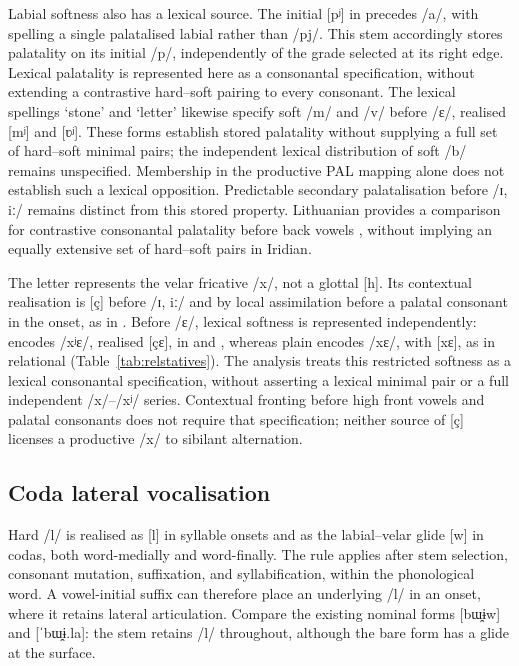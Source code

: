 Labial softness also has a lexical source. The initial [pʲ] in
 precedes /a/, with  spelling a single
palatalised labial rather than /pj/. This stem accordingly stores palatality on
its initial /p/, independently of the grade selected at its right edge.
Lexical palatality is represented here as a consonantal specification,
without extending a contrastive hard--soft pairing to every consonant.
The lexical spellings  `stone' and  `letter'
likewise specify soft /m/ and /v/ before /ɛ/, realised [mʲ] and [ʋʲ].
These forms establish stored palatality without supplying a full set of
hard--soft minimal pairs; the independent lexical distribution of soft /b/
remains unspecified. Membership in the productive PAL mapping alone does
not establish such a lexical opposition.
Predictable secondary palatalisation before /ɪ, iː/ remains distinct from
this stored property.
Lithuanian provides a comparison for contrastive consonantal palatality
before back vowels \cite{baksiene2024}, without implying an equally
extensive set of hard--soft pairs in Iridian.

The letter  represents the velar fricative /x/, not a glottal [h].
Its contextual realisation is [ç] before /ɪ, iː/ and by local assimilation
before a palatal consonant in the onset, as in .
Before /ɛ/, lexical softness is represented independently: 
encodes /xʲɛ/, realised [çɛ], in  and
, whereas plain  encodes /xɛ/, with [xɛ],
as in relational  (Table~\ref{tab:relstatives}). The
analysis treats this restricted softness as a lexical consonantal
specification, without asserting a lexical minimal pair or a full independent
/x/--/xʲ/ series. Contextual fronting before high front vowels and palatal
consonants does not require that specification; neither source of [ç]
licenses a productive /x/ to sibilant alternation.

\subsection{Coda lateral vocalisation}\label{sec:l-vocalisation}

Hard /l/ is realised as [l] in syllable onsets and as the labial--velar glide
[w] in codas, both word-medially and word-finally. The rule applies after
stem selection, consonant mutation, suffixation, and syllabification, within
the phonological word. A vowel-initial suffix can therefore place an underlying
/l/ in an onset, where it retains lateral articulation. Compare the existing
nominal forms  [bɯ̯ɨw] and  [ˈbɯ̯ɨ.la]: the stem retains
/l/ throughout, although the bare form has a glide at the surface.

